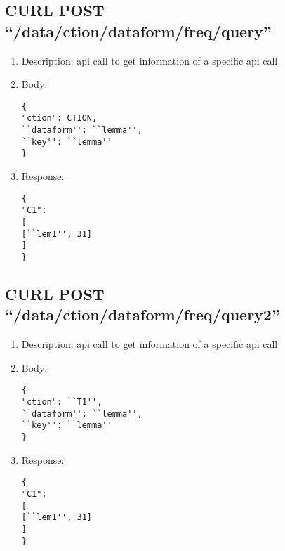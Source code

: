\documentclass{article}
\begin{document}
\subsection{CURL POST ``/data/ction/dataform/freq/query''}
\begin{enumerate}
\item Description: api call to get information of a specific api call
\item Body: 
\begin{lstlisting}
{ 
"ction": CTION,
``dataform'': ``lemma'',
``key'': ``lemma''
}
\end{lstlisting}
\item Response:
\begin{lstlisting}
{ 
"C1": 
[
[``lem1'', 31]
]
}
\end{lstlisting}
\end{enumerate}

\subsection{CURL POST ``/data/ction/dataform/freq/query2''}
\begin{enumerate}
\item Description: api call to get information of a specific api call
\item Body: 
\begin{lstlisting}
{ 
"ction": ``T1'',
``dataform'': ``lemma'',
``key'': ``lemma''
}
\end{lstlisting}
\item Response:
\begin{lstlisting}
{ 
"C1": 
[
[``lem1'', 31]
]
}
\end{lstlisting}
\end{enumerate}
\end{document}
